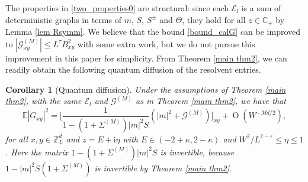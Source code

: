 \documentclass{article}
\newcommand{\1}{\mathds{1}}
\numberwithin{equation}{section}
\newcommand{\be}{\begin{equation}}
\newcommand{\ee}{\end{equation}}
\newcommand{\e}{{\varepsilon}}
\renewcommand{\cal}{\mathcal}
\newcommand{\ii}{\mathrm{i}} %
\renewcommand{\leq}{\leqslant}
\renewcommand{\le}{\leq}
\newcommand{\E}{\mathbb{E}}
\newcommand{\C}{\mathbb{C}}
\newcommand{\Z}{\mathbb{Z}}
\DeclareMathOperator{\OO}{O}
\theoremstyle{plain} %
\newtheorem{corollary}[theorem]{Corollary}
\theoremstyle{remark}
\newcommand{\wtSdelta}{\Sigma}
\newcommand{\Sele}{{\mathcal E}}
\begin{document}
The properties in \eqref{two_properties0} are structural: since each $\Sele_l$ is a sum of deterministic graphs in terms of $m$, $S$, $S^\pm$ and $\Theta$, they hold for all $z\in \C_+$ by Lemma \ref{lem Rsymm}.
We believe that the bound \eqref{bound_calG} can be improved to $|\cal G_{xy}^{(M)}|\le L^\tau B_{xy}^{2}$ with some extra work, but we do not pursue this improvement in this paper for simplicity. From Theorem \ref{main thm2}, we can readily obtain the following quantum diffusion of the resolvent entries. %
\begin{corollary}[Quantum diffusion]\label{main_cor}
	Under the assumptions of Theorem \ref{main thm2}, with the same $\Sele_l$ and $\cal G^{(M)}$ as in Theorem \ref{main thm2}, we have that
	\be\label{EGxy} \E |G_{xy}|^2 =  \bigg[ \frac{1}{1-\left(1+\wtSdelta^{(M)}\right)|m|^2  S} \left( |m|^2 + \cal G^{(M)}\right) \bigg]_{xy} %
	+ \OO( W^{-Md/2} ) ,
	\ee
	for all $x,y \in \Z_{L}^d$ and $z=E+\ii \eta$ with $E\in (-2+\kappa,2-\kappa)$ and $W^2/L^{2-\e}\le \eta\le 1$. Here the matrix $1-(1+\wtSdelta^{(M)})|m|^2S$ is invertible, because $1-|m|^2S(1+\wtSdelta^{(M)})$ is invertible by Theorem \ref{main thm2}.
\end{corollary}
\end{document}
